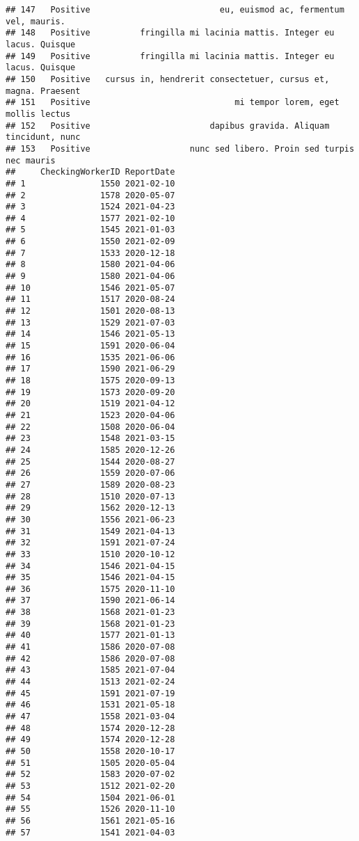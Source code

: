 \documentclass[
]{article}
\begin{document}
\begin{verbatim}
## 147   Positive                          eu, euismod ac, fermentum vel, mauris.
## 148   Positive          fringilla mi lacinia mattis. Integer eu lacus. Quisque
## 149   Positive          fringilla mi lacinia mattis. Integer eu lacus. Quisque
## 150   Positive   cursus in, hendrerit consectetuer, cursus et, magna. Praesent
## 151   Positive                             mi tempor lorem, eget mollis lectus
## 152   Positive                        dapibus gravida. Aliquam tincidunt, nunc
## 153   Positive                    nunc sed libero. Proin sed turpis nec mauris
##     CheckingWorkerID ReportDate
## 1               1550 2021-02-10
## 2               1578 2020-05-07
## 3               1524 2021-04-23
## 4               1577 2021-02-10
## 5               1545 2021-01-03
## 6               1550 2021-02-09
## 7               1533 2020-12-18
## 8               1580 2021-04-06
## 9               1580 2021-04-06
## 10              1546 2021-05-07
## 11              1517 2020-08-24
## 12              1501 2020-08-13
## 13              1529 2021-07-03
## 14              1546 2021-05-13
## 15              1591 2020-06-04
## 16              1535 2021-06-06
## 17              1590 2021-06-29
## 18              1575 2020-09-13
## 19              1573 2020-09-20
## 20              1519 2021-04-12
## 21              1523 2020-04-06
## 22              1508 2020-06-04
## 23              1548 2021-03-15
## 24              1585 2020-12-26
## 25              1544 2020-08-27
## 26              1559 2020-07-06
## 27              1589 2020-08-23
## 28              1510 2020-07-13
## 29              1562 2020-12-13
## 30              1556 2021-06-23
## 31              1549 2021-04-13
## 32              1591 2021-07-24
## 33              1510 2020-10-12
## 34              1546 2021-04-15
## 35              1546 2021-04-15
## 36              1575 2020-11-10
## 37              1590 2021-06-14
## 38              1568 2021-01-23
## 39              1568 2021-01-23
## 40              1577 2021-01-13
## 41              1586 2020-07-08
## 42              1586 2020-07-08
## 43              1585 2021-07-04
## 44              1513 2021-02-24
## 45              1591 2021-07-19
## 46              1531 2021-05-18
## 47              1558 2021-03-04
## 48              1574 2020-12-28
## 49              1574 2020-12-28
## 50              1558 2020-10-17
## 51              1505 2020-05-04
## 52              1583 2020-07-02
## 53              1512 2021-02-20
## 54              1504 2021-06-01
## 55              1526 2020-11-10
## 56              1561 2021-05-16
## 57              1541 2021-04-03

\end{verbatim}
\end{document}
